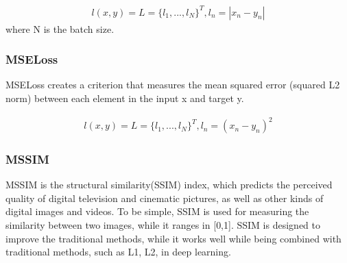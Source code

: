 \documentclass[letterpaper,10pt,english]{sphinxmanual}
\begin{document}
%
\begin{sphinxVerbatim}[commandchars=\\\{\}]
\end{sphinxVerbatim}
\begin{equation*}
\begin{split}l(x,y) = L = \{l_1, ..., l_N\}^T, l_n = |x_n-y_n|\end{split}
\end{equation*}
where N is the batch size.


\subsubsection{MSELoss}
\label{\detokenize{usage/train:mseloss}}
MSELoss creates a criterion that measures the mean squared error (squared L2 norm) between each element in the input x and target y.

%
\begin{sphinxVerbatim}[commandchars=\\\{\}]
\end{sphinxVerbatim}
\begin{equation*}
\begin{split}l(x,y) = L = \{l_1, ..., l_N\}^T, l_n = (x_n-y_n)^2\end{split}
\end{equation*}

\subsubsection{MSSIM}
\label{\detokenize{usage/train:mssim}}
MSSIM is the structural similarity(SSIM) index, which predicts the perceived quality of digital television and cinematic pictures, as well as other kinds of digital images and videos. To be simple, SSIM is used for measuring the similarity between two images, while it ranges in {[}0,1{]}. SSIM is designed to improve the traditional methods, while it works well while being combined with traditional methods, such as L1, L2, in deep learning.

%
\begin{sphinxVerbatim}[commandchars=\\\{\}]
 
\end{sphinxVerbatim}
\end{document}
